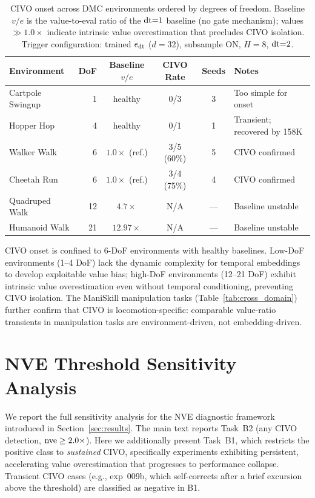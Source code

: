 \begin{table}[h]
\centering
\caption{CIVO onset across DMC environments ordered by degrees of freedom. Baseline $v/e$ is the value-to-eval ratio of the $\mathrm{dt}{=}1$ baseline (no gate mechanism); values $\gg 1.0\times$ indicate intrinsic value overestimation that precludes CIVO isolation. Trigger configuration: trained $e_{\mathrm{dt}}$ ($d{=}32$), subsample ON, $H{=}8$, $\mathrm{dt}{=}2$.}
\label{tab:dof_boundary}
\footnotesize
\begin{tabular}{lrcccl}
\toprule
\textbf{Environment} & \textbf{DoF} & \textbf{Baseline $v/e$} & \textbf{CIVO Rate} & \textbf{Seeds} & \textbf{Notes} \\
\midrule
Cartpole Swingup & 1 & healthy & 0/3 & 3 & Too simple for onset \\
Hopper Hop & 4 & healthy & 0/1 & 1 & Transient; recovered by 158K \\
\midrule
Walker Walk & 6 & $1.0\times$ (ref.) & 3/5 (60\%) & 5 & CIVO confirmed \\
Cheetah Run & 6 & $1.0\times$ (ref.) & 3/4 (75\%) & 4 & CIVO confirmed \\
\midrule
Quadruped Walk & 12 & $4.7\times$ & N/A & --- & Baseline unstable \\
Humanoid Walk & 21 & $12.97\times$ & N/A & --- & Baseline unstable \\
\bottomrule
\end{tabular}
\end{table}

CIVO onset is confined to 6-DoF environments with healthy baselines. Low-DoF environments (1--4 DoF) lack the dynamic complexity for temporal embeddings to develop exploitable value bias; high-DoF environments (12--21 DoF) exhibit intrinsic value overestimation even without temporal conditioning, preventing CIVO isolation. The ManiSkill manipulation tasks (Table~\ref{tab:cross_domain}) further confirm that CIVO is locomotion-specific: comparable value-ratio transients in manipulation tasks are environment-driven, not embedding-driven.

\section{NVE Threshold Sensitivity Analysis}
\label{sec:appendix_sensitivity}

We report the full sensitivity analysis for the NVE diagnostic framework introduced in Section~\ref{sec:results}. The main text reports Task~B2 (any CIVO detection, $\mathrm{nve} \geq 2.0\times$). Here we additionally present Task~B1, which restricts the positive class to \emph{sustained} CIVO, specifically experiments exhibiting persistent, accelerating value overestimation that progresses to performance collapse. Transient CIVO cases (e.g., exp~009b, which self-corrects after a brief excursion above the threshold) are classified as negative in B1.

